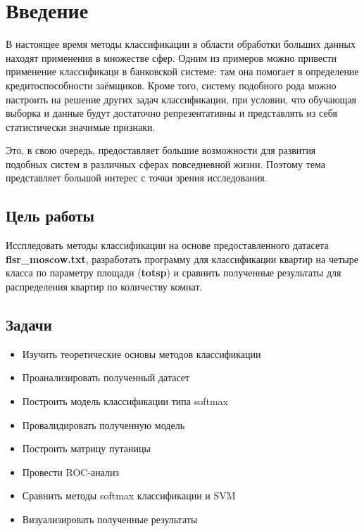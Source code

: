 \section{Введение}
В настоящее время методы классификации в области обработки больших данных находят применения в множестве сфер.
Одним из примеров можно привести применение классификаци в банковской системе: там она помогает в определение кредитоспособности заёмщиков. Кроме того, систему подобного рода можно настроить на решение других задач классификации, при условии, что обучающая выборка и данные будут достаточно репрезентативны и представлять из себя статистически значимые признаки.

Это, в свою очередь, предоставляет большие возможности для развития подобных систем в различных сферах повседневной жизни. Поэтому тема представляет большой интерес с точки зрения исследования.

\subsection*{Цель работы}
Исспледовать методы классификации на основе предоставленного датасета \textbf{flsr\_moscow.txt},
разработать программу для классификации квартир на четыре класса по параметру площади (\textbf{totsp}) и сравнить полученные результаты для распределения квартир по количеству комнат.

\subsection*{Задачи}
\begin{itemize}
    \item Изучить теоретические основы методов классификации
    \item Проанализировать полученный датасет
    \item Построить модель классификации типа softmax
    \item Провалидировать полученную модель
    \item Построить матрицу путаницы 
    \item Провести ROC-анализ
    \item Сравнить методы softmax классификации и SVM
    \item Визуализировать полученные результаты
\end{itemize}